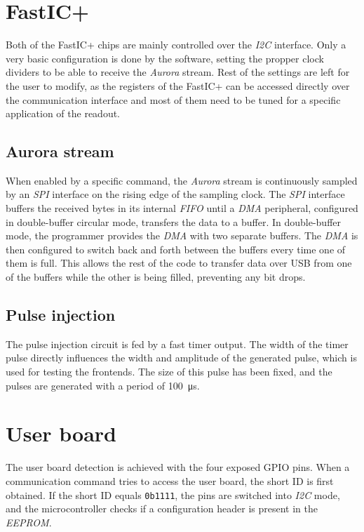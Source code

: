 \section{FastIC+}
Both of the FastIC+ chips are mainly controlled over the \emph{I2C} interface. Only a very basic configuration is done by the software, setting the propper clock dividers to be able to receive the \emph{Aurora} stream. Rest of the settings are left for the user to modify, as the registers of the FastIC+ can be accessed directly over the communication interface and most of them need to be tuned for a specific application of the readout.
\subsection{Aurora stream}
When enabled by a specific command, the \emph{Aurora} stream is continuously sampled by an \emph{SPI} interface on the rising edge of the sampling clock. The \emph{SPI} interface buffers the received bytes in its internal \emph{FIFO} until a \emph{DMA} peripheral, configured in double-buffer circular mode, transfers the data to a buffer. In double-buffer mode, the programmer provides the \emph{DMA} with two separate buffers. The \emph{DMA} is then configured to switch back and forth between the buffers every time one of them is full. This allows the rest of the code to transfer data over USB from one of the buffers while the other is being filled, preventing any bit drops.

\subsection{Pulse injection}
The pulse injection circuit is fed by a fast timer output. The width of the timer pulse directly influences the width and amplitude of the generated pulse, which is used for testing the frontends. The size of this pulse has been fixed, and the pulses are generated with a period of \SI{100}{\micro\second}.
\newpage
\section{User board}

The user board detection is achieved with the four exposed GPIO pins. When a communication command tries to access the user board, the short ID is first obtained. If the short ID equals \verb|0b1111|, the pins are switched into \emph{I2C} mode, and the microcontroller checks if a configuration header is present in the \emph{EEPROM}. 

